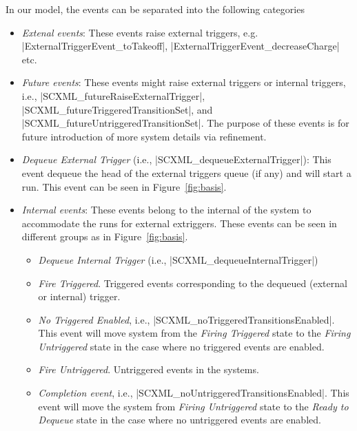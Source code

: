 In our \EventB model, the events can be separated into the following
categories
\begin{itemize}
\item \emph{Extenal events}: These events raise external triggers,
  e.g. |ExternalTriggerEvent_toTakeoff|,
  |ExternalTriggerEvent_decreaseCharge| etc.
  
\item \emph{Future events}: These events might raise external triggers or
  internal triggers, i.e., |SCXML_futureRaiseExternalTrigger|,
  |SCXML_futureTriggeredTransitionSet|, and
  |SCXML_futureUntriggeredTransitionSet|.  The purpose of these events
  is for future introduction of more system details via refinement.
  
\item \emph{Dequeue External Trigger} (i.e.,
  |SCXML_dequeueExternalTrigger|): This event dequeue the head of the
  external triggers queue (if any) and will start a run. This event
  can be seen in Figure~\ref{fig:basis}.

\item \emph{Internal events}: These events belong to the internal of
  the system to accommodate the runs for external extriggers.  These
  events can be seen in different groups as in Figure~\ref{fig:basis}.
  \begin{itemize}
  \item \emph{Dequeue Internal Trigger} (i.e.,
    |SCXML_dequeueInternalTrigger|)
    
  \item \emph{Fire Triggered}. Triggered events corresponding
    to the dequeued (external or internal) trigger.

  \item \emph{No Triggered Enabled}, i.e., |SCXML_noTriggeredTransitionsEnabled|. 
    This event will move system from the \emph{Firing Triggered} state to
    the \emph{Firing Untriggered} state in the case where no triggered
    events are enabled.
    
  \item \emph{Fire Untriggered}.  Untriggered events in the systems.

  \item \emph{Completion event}, i.e.,
    |SCXML_noUntriggeredTransitionsEnabled|. This event will move the
    system from \emph{Firing Untriggered} state to the \emph{Ready to
      Dequeue} state in the case where no untriggered events are enabled.
\end{itemize}
\end{itemize}



